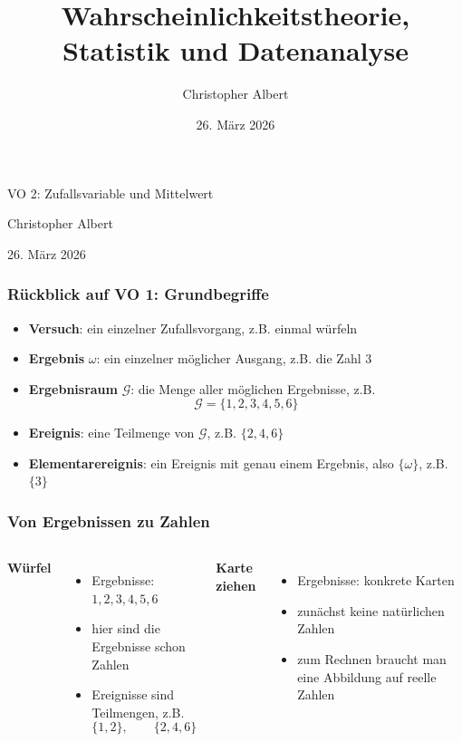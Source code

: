 \documentclass[aspectratio=169,professionalfonts]{beamer}
\title{Wahrscheinlichkeitstheorie, Statistik und Datenanalyse}
\author{Christopher Albert}
\date{26. M\"arz 2026}
\begin{document}
\begin{frame}[plain]
  \vspace{1.2cm}
  {\color{wsdblue}\inserttitle\par}
  \vspace{0.5cm}
  {VO 2: Zufallsvariable und Mittelwert\par}
  \vspace{0.3cm}
  {\large Christopher Albert\par}
  \vfill
  {\large 26. M\"arz 2026\par}
\end{frame}

\begin{frame}
  \frametitle{R\"uckblick auf VO 1: Grundbegriffe}

  \begin{itemize}
    \item \textbf{Versuch}: ein einzelner Zufallsvorgang, z.B. einmal w\"urfeln
    \item \textbf{Ergebnis} \(\omega\): ein einzelner m\"oglicher Ausgang, z.B. die Zahl \(3\)
    \item \textbf{Ergebnisraum} \(\mathcal G\): die Menge aller m\"oglichen Ergebnisse, z.B.
    \[
      \mathcal G=\{1,2,3,4,5,6\}
    \]
    \item \textbf{Ereignis}: eine Teilmenge von \(\mathcal G\), z.B. \(\{2,4,6\}\)
    \item \textbf{Elementarereignis}: ein Ereignis mit genau einem Ergebnis, also \(\{\omega\}\), z.B. \(\{3\}\)
  \end{itemize}
\end{frame}

\begin{frame}
  \frametitle{Von Ergebnissen zu Zahlen}

  \begin{columns}[T,onlytextwidth]
    \textbf{W\"urfel}
    \begin{itemize}
      \item Ergebnisse: \(1,2,3,4,5,6\)
      \item hier sind die Ergebnisse schon Zahlen
      \item Ereignisse sind Teilmengen, z.B.
      \[
        \{1,2\},\qquad \{2,4,6\}
      \]
    \end{itemize}

    \textbf{Karte ziehen}
    \begin{itemize}
      \item Ergebnisse: konkrete Karten
      \item zun\"achst keine nat\"urlichen Zahlen
      \item zum Rechnen braucht man eine Abbildung auf reelle Zahlen
    \end{itemize}
  \end{columns}
\end{frame}
\end{document}
